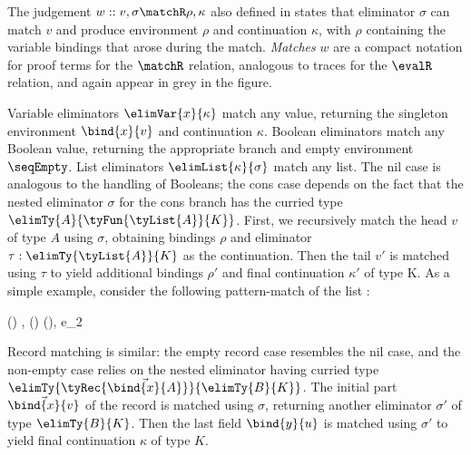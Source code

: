The judgement $w :: v, \sigma \matchR \rho, \kappa$ also defined in  states that eliminator $\sigma$ can match $v$ and produce environment $\rho$ and continuation $\kappa$, with $\rho$ containing the variable bindings that arose during the match. \emph{Matches} $w$ are a compact notation for proof terms for the $\matchR$ relation, analogous to traces for the $\evalR$ relation, and again appear in grey in the figure.

Variable eliminators $\elimVar{x}{\kappa}$ match any value, returning the singleton environment $\bind{x}{v}$ and continuation $\kappa$. Boolean eliminators match any Boolean value, returning the appropriate branch and empty environment $\seqEmpty$. List eliminators $\elimList{\kappa}{\sigma}$ match any list. The nil case is analogous to the handling of Booleans; the cons case depends on the fact that the nested eliminator $\sigma$ for the cons branch has the curried type $\elimTy{A}{\tyFun{\tyList{A}}{K}}$. First, we recursively match the head $v$ of type $A$ using $\sigma$, obtaining bindings $\rho$ and eliminator $\tau: \elimTy{\tyList{A}}{K}$ as the continuation. Then the tail $v'$ is matched using $\tau$ to yield additional bindings $\rho'$ and final continuation $\kappa'$ of type K. As a simple example, consider the following pattern-match of the list :

\begin{smathpar}
   {
      \explVal
         {()}
         {, 
          \matchR
          () \concat (), e_2}
   }
\end{smathpar}

\noindent Record matching is similar: the empty record case resembles the nil case, and the non-empty case relies on the nested eliminator having curried type $\elimTy{\tyRec{\vec{\bind{x}{A}}}}{\elimTy{B}{K}}$. The initial part $\vec{\bind{x}{v}}$ of the record is matched using $\sigma$, returning another eliminator $\sigma'$ of type $\elimTy{B}{K}$. Then the last field $\bind{y}{u}$ is matched using $\sigma'$ to yield final continuation $\kappa$ of type $K$.
